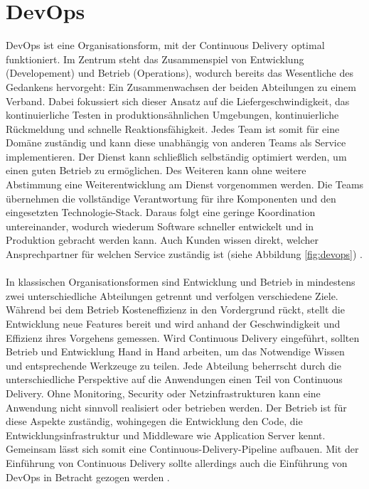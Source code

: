 \section{DevOps}
DevOps ist eine Organisationsform, mit der Continuous Delivery optimal funktioniert. Im Zentrum steht das Zusammenspiel von Entwicklung (Developement) und Betrieb (Operations), wodurch bereits das Wesentliche des Gedankens hervorgeht: Ein Zusammenwachsen der beiden Abteilungen zu einem Verband. Dabei fokussiert sich dieser Ansatz auf die Liefergeschwindigkeit, das kontinuierliche Testen in produktionsähnlichen Umgebungen, kontinuierliche Rückmeldung und schnelle Reaktionsfähigkeit. Jedes Team ist somit für eine Domäne zuständig und kann diese unabhängig von anderen Teams als Service implementieren. Der Dienst kann schließlich selbständig optimiert werden, um einen guten Betrieb zu ermöglichen. Des Weiteren kann ohne weitere Abstimmung eine Weiterentwicklung am Dienst vorgenommen werden. Die Teams übernehmen die vollständige Verantwortung für ihre Komponenten und den eingesetzten Technologie-Stack. Daraus folgt eine geringe Koordination untereinander, wodurch wiederum Software schneller entwickelt und in Produktion gebracht werden kann. Auch Kunden wissen direkt, welcher Ansprechpartner für welchen Service zuständig ist (siehe Abbildung \ref{fig:devops}) \cite{Wolff.2016}.\\ \\
In klassischen Organisationsformen sind Entwicklung und Betrieb in mindestens zwei unterschiedliche Abteilungen getrennt und verfolgen verschiedene Ziele. Während bei dem Betrieb Kosteneffizienz in den Vordergrund rückt, stellt die Entwicklung neue Features bereit und wird anhand der Geschwindigkeit und Effizienz ihres Vorgehens gemessen. Wird Continuous Delivery eingeführt, sollten Betrieb und Entwicklung Hand in Hand arbeiten, um das Notwendige Wissen und entsprechende Werkzeuge zu teilen. Jede Abteilung beherrscht durch die unterschiedliche Perspektive auf die Anwendungen einen Teil von Continuous Delivery. Ohne Monitoring, Security oder Netzinfrastrukturen kann eine Anwendung nicht sinnvoll realisiert oder betrieben werden. Der Betrieb ist für diese Aspekte zuständig, wohingegen die Entwicklung den Code, die Entwicklungsinfrastruktur und Middleware wie Application Server kennt. Gemeinsam lässt sich somit eine Continuous-Delivery-Pipeline aufbauen. Mit der Einführung von Continuous Delivery sollte allerdings auch die Einführung von DevOps in Betracht gezogen werden \cite{Wolff.2016}.\\ \\
